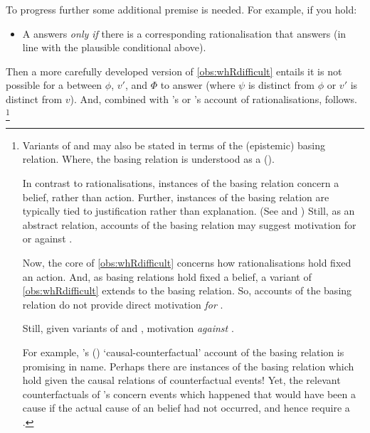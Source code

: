 \begin{note}
  To progress further some additional premise is needed.
  For example, if you hold:
  \begin{itemize}
  \item
    A \ros{} answers \qWhy{} \emph{only if} there is a corresponding rationalisation that answers \qWhyR{} (in line with the plausible conditional above).
  \end{itemize}
  Then a more carefully developed version of \autoref{obs:whRdifficult} entails it is not possible for a \ros{} between \(\phi\), \(v'\), and \(\Phi\) to answer \qWhy{} (where \(\psi\) is distinct from \(\phi\) or \(v'\) is distinct from \(v\)).
  And, combined with \citeauthor{Davidson:1963aa}'s or \citeauthor{Hieronymi:2011aa}'s account of rationalisations, \issueInclusion{} follows.%
  \footnote{
    Variants of \qWhy{} and \qHow{} may also be stated in terms of the (epistemic) basing relation.
    Where, the basing relation is understood as a  (\cite{Korcz:2021ue}).

    In contrast to rationalisations, instances of the basing relation concern a belief, rather than action.
    Further, instances of the basing relation are typically tied to justification rather than explanation.
    (See \cite{Korcz:2021ue} and \cite[35]{Pollock:1999tm})
    Still, as an abstract relation, accounts of the basing relation may suggest motivation for or against \issueInclusion{}.

    Now, the core of \autoref{obs:whRdifficult} concerns how rationalisations hold fixed an action.
    And, as basing relations hold fixed a belief, a variant of \autoref{obs:whRdifficult} extends to the basing relation.
    So, accounts of the basing relation do not provide direct motivation \emph{for} \issueInclusion{}.

    Still, given variants of \qWhy{} and \qHow{}, motivation \emph{against} \issueInclusion{}.

    For example, \citeauthor{Swain:1981wd}'s (\citeyear{Swain:1981wd}) `causal-counterfactual' account of the basing relation is promising in name.
    Perhaps there are instances of the basing relation which hold given the causal relations of counterfactual events!
    Yet, the relevant counterfactuals of \citeauthor{Swain:1981wd}'s concern events which happened that would have been a cause if the actual cause of an \agents{} belief had not occurred, and hence require a .

}
\end{note}
